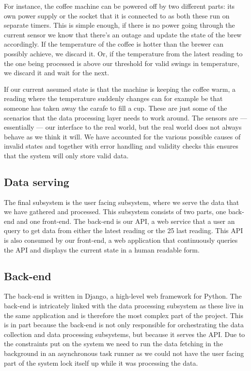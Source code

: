 \documentclass[12pt,a4paper,oneside,article]{memoir}
\numberwithin{equation}{chapter}
\begin{document}
For instance, the coffee machine can be powered off by two different parts: its
own power supply or the socket that it is connected to as both these run on
separate timers. This is simple enough, if there is no power going through the
current sensor we know that there's an outage and update the state of the brew
accordingly. If the temperature of the coffee is hotter than the brewer can
possibly achieve, we discard it. Or, if the temperature from the latest reading
to the one being processed is above our threshold for valid swings in
temperature, we discard it and wait for the next.

If our current assumed state is that the machine is keeping the coffee warm, a
reading where the temperature suddenly changes can for example be that someone
has taken away the carafe to fill a cup. These are just some of the scenarios
that the data processing layer needs to work around. The sensors are ---
essentially --- our interface to the real world, but the real world does not
always behave as we think it will. We have accounted for the various possible
causes of invalid states and together with error handling and validity checks
this ensures that the system will only store valid data.

\subsection{Data serving}\label{sec:data-serving}
The final subsystem is the user facing subsystem, where we serve the data that
we have gathered and processed. This subsystem consists of two parts, one
back-end and one front-end. The back-end is our API, a web service that a user
an query to get data from either the latest reading or the 25 last reading. This
API is also consumed by our front-end, a web application that continuously
queries the API and displays the current state in a human readable form.

\subsection{Back-end}\label{sec:back-end}
The back-end is written in Django, a high-level web framework for Python. The
back-end is intricately linked with the data processing subsystem as these live
in the same application and is therefore the most complex part of the project.
This is in part because the back-end is not only responsible for orchestrating
the data collection and data processing subsystems, but because it serves the
API. Due to the constraints put on the system we need to run the data fetching
in the background in an asynchronous task runner as we could not have the user
facing part of the system lock itself up while it was processing the data.
\end{document}
